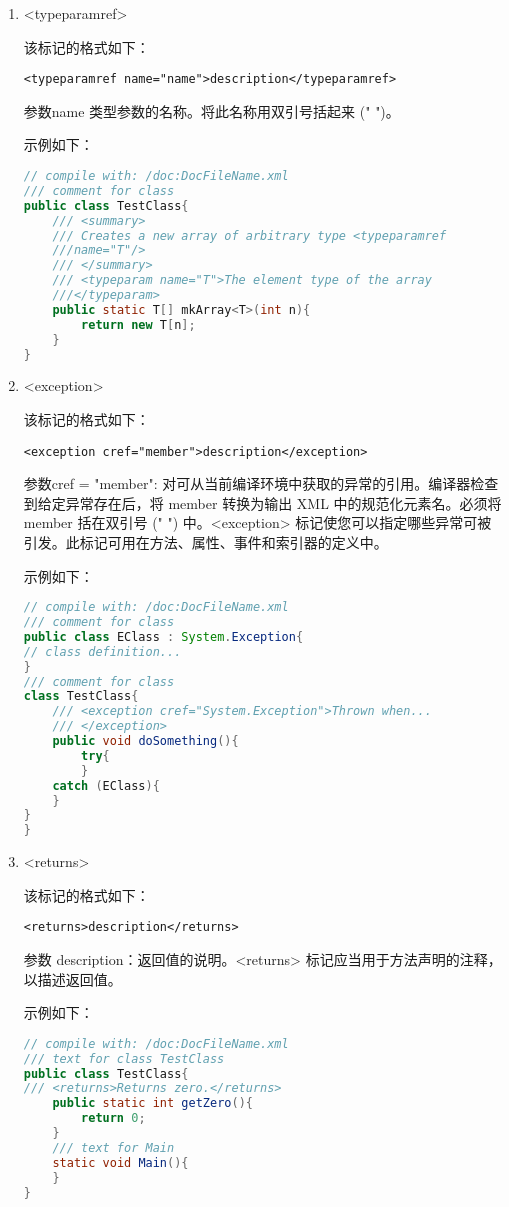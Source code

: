 \begin{enumerate}
\item <typeparamref>

该标记的格式如下： 
\begin{lstlisting}
<typeparamref name="name">description</typeparamref>
\end{lstlisting}
参数name 类型参数的名称。将此名称用双引号括起来 (" ")。

示例如下：
\begin{lstlisting}[language=java]
// compile with: /doc:DocFileName.xml 
/// comment for class
public class TestClass{
    /// <summary> 
    /// Creates a new array of arbitrary type <typeparamref 
    ///name="T"/>
    /// </summary>
    /// <typeparam name="T">The element type of the array
    ///</typeparam>
    public static T[] mkArray<T>(int n){
        return new T[n];
    }
}
\end{lstlisting}

\item <exception>
 
该标记的格式如下：
\begin{lstlisting}
<exception cref="member">description</exception>
\end{lstlisting}
参数cref = "member": 对可从当前编译环境中获取的异常的引用。编译器检查到给定异常存在后，将 member 转换为输出 XML 中的规范化元素名。必须将 member 括在双引号 (" ") 中。<exception> 标记使您可以指定哪些异常可被引发。此标记可用在方法、属性、事件和索引器的定义中。

示例如下：
\begin{lstlisting}[language=java]
// compile with: /doc:DocFileName.xml 
/// comment for class
public class EClass : System.Exception{
// class definition...
}
/// comment for class
class TestClass{
    /// <exception cref="System.Exception">Thrown when...
    /// </exception>
    public void doSomething(){
        try{ 
        }
    catch (EClass){ 
    }
}
}
\end{lstlisting}

\item <returns>

该标记的格式如下：
\begin{lstlisting}
<returns>description</returns>
\end{lstlisting}
参数 description：返回值的说明。<returns> 标记应当用于方法声明的注释，以描述返回值。

示例如下：
\begin{lstlisting}[language=java]
// compile with: /doc:DocFileName.xml 
/// text for class TestClass
public class TestClass{
/// <returns>Returns zero.</returns>
    public static int getZero(){
        return 0;
    }
    /// text for Main
    static void Main(){ 
    }
}
\end{lstlisting}


\end{enumerate}
